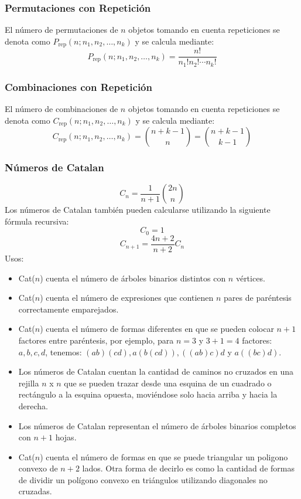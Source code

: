 \subsubsection{Permutaciones con Repetición}
El número de permutaciones de $n$ objetos tomando en cuenta repeticiones se denota como $P_{\text{rep}}(n; n_1, n_2, \ldots, n_k)$ y se calcula mediante:
\[ P_{\text{rep}}(n; n_1, n_2, \ldots, n_k) = \frac{n!}{n_1!n_2!\cdots n_k!} \]

\subsubsection{Combinaciones con Repetición}
El número de combinaciones de $n$ objetos tomando en cuenta repeticiones se denota como $C_{\text{rep}}(n; n_1, n_2, \ldots, n_k)$ y se calcula mediante:
\[ C_{\text{rep}}(n; n_1, n_2, \ldots, n_k) = \binom{n + k - 1}{n} = \binom{n + k - 1}{k - 1} \]

\subsubsection{Números de Catalan}
\[ C_n = \frac{1}{n+1} \binom{2n}{n} \]
Los números de Catalan también pueden calcularse utilizando la siguiente fórmula recursiva:
\[ C_0 = 1 \]
\[ C_{n+1} = \frac{4n+2}{n+2} C_n \]
Usos:
\begin{itemize}
    \item  Cat($n$) cuenta el número de árboles binarios distintos con $n$ vértices.

    \item  Cat($n$) cuenta el número de expresiones que contienen $n$ pares de paréntesis correctamente emparejados.

    \item  Cat($n$) cuenta el número de formas diferentes en que se pueden colocar $n+1$ factores entre paréntesis, por ejemplo, para $n=3$ y $3+1=4$ factores: ${a, b, c, d}$, tenemos: $(ab)(cd), a(b(cd)), ((ab)c)d$ y $a((bc)d)$.
    
    \item  Los números de Catalan cuentan la cantidad de caminos no cruzados en una rejilla $n$ x $n$ que se pueden trazar desde una esquina de un cuadrado o rectángulo a la esquina opuesta, moviéndose solo hacia arriba y hacia la derecha.
    
    \item  Los números de Catalan representan el número de árboles binarios completos con $n+1$ hojas.
    
    \item  Cat($n$) cuenta el número de formas en que se puede triangular un poligono convexo de $n+2$ lados. Otra forma de decirlo es como la cantidad de formas de dividir un polígono convexo en triángulos utilizando diagonales no cruzadas.
    
\end{itemize}

